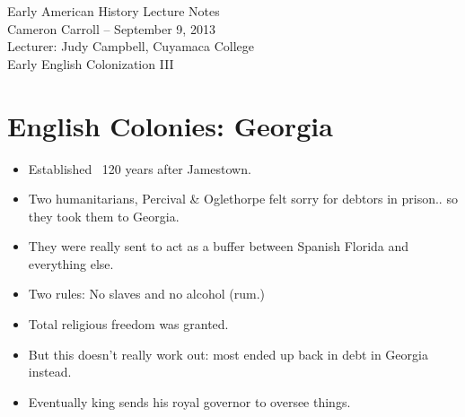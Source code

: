 \documentclass{article}
\begin{document}
  \begin{center}
    {\small{} Early American History Lecture Notes} \\[0.6cm]
    {\small{} Cameron Carroll -- September 9, 2013} \\[0.6cm]
    {\small{} Lecturer: Judy Campbell, Cuyamaca College}\\[1cm]
    {\small{} Early English Colonization III}\\[1cm]
  \end{center}
  
  \tableofcontents
  \newpage
  
\section{English Colonies: Georgia}
  \begin{itemize}
    \item Established ~120 years after Jamestown.
    \item Two humanitarians, Percival \& Oglethorpe felt sorry for debtors in prison.. so they took them to Georgia.
    \item They were really sent to act as a buffer between Spanish Florida and everything else. 
    \item Two rules: No slaves and no alcohol (rum.) 
    \item Total religious freedom was granted. 
    \item But this doesn't really work out: most ended up back in debt in Georgia instead. 
    \item Eventually king sends his royal governor to oversee things.
  \end{itemize}
\end{document}

